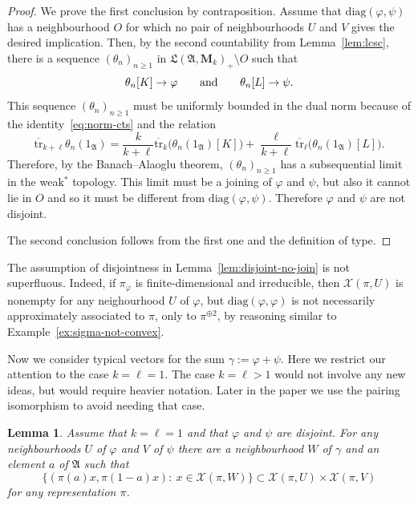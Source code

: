\documentclass[12pt,a4paper]{article}
\numberwithin{equation}{section}
\newtheorem{lem}[thm]{Lemma}
\theoremstyle{remark}
\renewcommand{\rm}[1]{\mathrm{#1}}
\newcommand{\rmM}{\mathbf{M}}
\newcommand{\X}{\mathcal{X}}
\newcommand{\A}{\mathfrak{A}}
\newcommand{\frL}{\mathfrak{L}}
\renewcommand{\phi}{\varphi}
\newcommand{\g}{\gamma}
\newcommand{\tr}{\overline{\mathrm{tr}}}
\begin{document}
\begin{proof}
We prove the first conclusion by contraposition. Assume that $\rm{diag}(\phi,\psi)$ has a neighbourhood $O$ for which no pair of neighbourhoods $U$ and $V$ gives the desired implication.  Then, by the second countability from Lemma~\ref{lem:lcsc}, there is a sequence $(\theta_n)_{n\ge 1}$ in $\frL(\A,\rmM_k)_+\setminus O$ such that
\[\theta_n[K]\to \phi \qquad \hbox{and} \qquad \theta_n[L] \to \psi.\]
This sequence $(\theta_n)_{n\ge 1}$ must be uniformly bounded in the dual norm because of the identity~\eqref{eq:norm-cts} and the relation
\[\tr_{k+\ell}\theta_n(1_\A) = \frac{k}{k+\ell}\tr_k\big(\theta_n(1_\A)[K]\big) + \frac{\ell}{k+\ell}\tr_\ell\big(\theta_n(1_\A)[L]\big).\]
Therefore, by the Banach--Alaoglu theorem, $(\theta_n)_{n\ge 1}$ has a subsequential limit in the weak$^\ast$ topology.  This limit must be a joining of $\phi$ and $\psi$, but also it cannot lie in $O$ and so it must be different from $\rm{diag}(\phi,\psi)$.  Therefore $\phi$ and $\psi$ are not disjoint.

The second conclusion follows from the first one and the definition of type.
\end{proof}

The assumption of disjointness in Lemma~\ref{lem:disjoint-no-join} is not superfluous.  Indeed, if $\pi_\phi$ is finite-dimensional and irreducible, then $\X(\pi,U)$ is nonempty for any neighourhood $U$ of $\phi$, but $\rm{diag}(\phi,\phi)$ is not necessarily approximately associated to $\pi$, only to $\pi^{\oplus 2}$, by reasoning similar to Example~\ref{ex:sigma-not-convex}.

Now we consider typical vectors for the sum $\g := \phi + \psi$.  Here we restrict our attention to the case $k = \ell = 1$.  The case $k=\ell > 1$ would not involve any new ideas, but would require heavier notation.  Later in the paper we use the pairing isomorphism to avoid needing that case.

\begin{lem}\label{lem:split-into-disjoint}
Assume that $k=\ell=1$ and that $\phi$ and $\psi$ are disjoint.  For any neighbourhoods $U$ of $\phi$ and $V$ of $\psi$ there are a neighbourhood $W$ of $\g$ and an element $a$ of $\A$ such that
\[\{(\pi(a)x,\pi(1-a)x):\ x \in \X(\pi,W)\} \subset  \X(\pi,U) \times \X(\pi,V)\]
for any representation $\pi$.
\end{lem}
\end{document}
